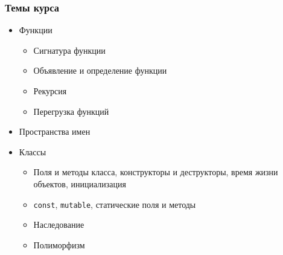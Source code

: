 \documentclass{beamer}
\begin{document}
\begin{frame}

    \frametitle{Темы курса}

    \begin{itemize}

        \item Функции

            \begin{itemize}

                \item Сигнатура функции

                \item Объявление и определение функции

                \item Рекурсия

                \item Перегрузка функций

            \end{itemize}

        \item Пространства имен

        \item Классы

            \begin{itemize}

                \item Поля и методы класса, конструкторы и деструкторы,
                    время жизни объектов, инициализация

                \item \texttt{const}, \texttt{mutable}, статические поля и методы

                \item Наследование

                \item Полиморфизм

            \end{itemize}

    \end{itemize}

\end{frame}
\end{document}
